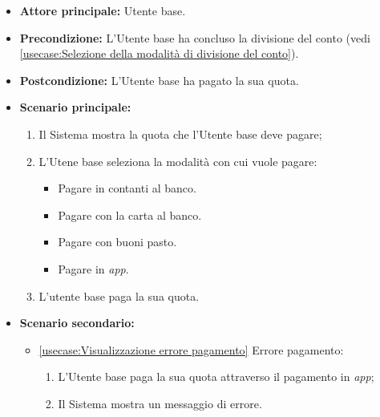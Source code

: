 \label{usecase:Pagamento del conto}
\begin{itemize}
	\item \textbf{Attore principale:} Utente base.

	\item \textbf{Precondizione:} L'Utente base ha concluso la divisione del conto (vedi \autoref{usecase:Selezione della modalità di divisione del conto}).

	\item \textbf{Postcondizione:} L'Utente base ha pagato la sua quota.

	\item \textbf{Scenario principale:}
            \begin{enumerate}
                \item Il Sistema mostra la quota che l'Utente base deve pagare;
                \item L'Utene base seleziona la modalità con cui vuole pagare:
                \begin{itemize}
                    \item Pagare in contanti al banco.
                    \item Pagare con la carta al banco.
                    \item Pagare con buoni pasto.
                    \item Pagare in \textit{app}.
                \end{itemize}
				\item L'utente base paga la sua quota.
	      \end{enumerate}

    \item \textbf{Scenario secondario:}
		  \begin{itemize}
			  \item \autoref{usecase:Visualizzazione errore pagamento} Errore pagamento:
				\begin{enumerate}
					\item L'Utente base paga la sua quota attraverso il pagamento in \textit{app};
					\item  Il Sistema mostra un messaggio di errore.
				\end{enumerate}
		  \end{itemize}
\end{itemize}